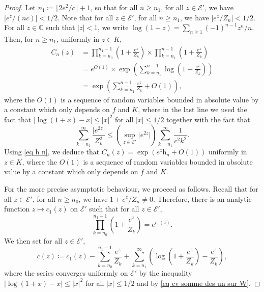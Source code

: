\documentclass[11pt]{article}
\numberwithin{equation}{section}
\def \C{\mathbb{C}}
\begin{document}
\begin{proof}
	Let $n_1 \coloneqq \lfloor 2e^2/c \rfloor +1$, so that for all $n\ge n_1$, for all $z \in \mathcal{E}'$, 
	we have $
	\left\vert  {e^z}/({nc}) \right\vert <{1}/{2}$. 
	Note that for all $z \in \mathcal{E}'$, for all $n\ge n_1$, we have $\vert e^z/Z_n\vert <1/2$. For all $z\in \C$ such that $\vert z\vert <1$, we write $\log (1+z) = \sum_{n\ge 1} {(-1)^{n-1}}z^n/n$. Then, for $n\ge n_1$, uniformly in $z \in K$,
	\begin{align*}
		C_n(z)&=\prod_{k=n_0}^{n_1-1} \left( 1+ \frac{e^z}{Z_k} \right)  \times   \prod_{k=n_1}^{n-1}  \left( 1+ \frac{e^z}{Z_k} \right)  \\
		&=e^{O(1)} \times \exp\left( \sum_{k=n_1}^{n-1} \log \left(1+ \frac{e^z}{Z_k}  \right) \right)\\
		&= \exp\left( \sum_{k=n_1}^{n-1} \frac{e^z}{Z_k} +O(1) \right),
	\end{align*}
	where the $O(1)$ is a sequence of random variables bounded in absolute value by a constant which only depends on $f$ and $K$, where in the last line we used the fact that $\vert \log (1+x) - x\vert\le  \vert x\vert^2$ for all $\vert x \vert \le 1/2$ together with the fact that
	\begin{equation}\label{eq cv somme des un sur W}
	\sum_{k=n_1}^\infty \frac{\vert e^{2z}\vert}{Z_k^2}\le \left(\sup_{z \in \mathcal{E}'}\vert e^{2z}\vert\right) \sum_{k=n_1}^\infty \frac{1}{c^2k^2}.
	\end{equation}
	Using \eqref{eq h n}, we deduce that $C_n(z)=\exp(e^z \mathrm{h}_n +O(1))$ uniformly in $z \in K$, where the $O(1)$ is a sequence of random variables bounded in absolute value by a constant which only depends on $f$ and $K$.
	
	For the more precise asymptotic behaviour, we proceed as follows. Recall that for all $z \in \mathcal{E}'$, for all $n\ge n_0$, we have $1+e^z/Z_n\neq 0$. Therefore, there is an analytic function $z\mapsto c_1(z)$ on $\mathcal{E}'$ such that for all $z \in \mathcal{E}'$, 
	\[
	\prod_{k=n_0}^{n_1-1} \left( 1+ \frac{e^z}{Z_k} \right)  = e^{c_1(z)}.
	\]
	We then set for all $z \in \mathcal{E}'$,
	\[
	c(z) \coloneqq c_1(z) - \sum_{k=n_0}^{n_1 -1} \frac{e^z}{Z_k}+ \sum_{k=n_1}^\infty \left( \log \left(1+ \frac{e^z}{Z_k} \right) - \frac{e^z}{Z_k}\right),
	\]
	where the series converges uniformly on $\mathcal{E}'$ by the inequality $\vert \log (1+x) - x\vert\le  \vert x\vert^2$ for all $\vert x \vert \le 1/2$ and by \eqref{eq cv somme des un sur W}.
	

\end{proof}
\end{document}
